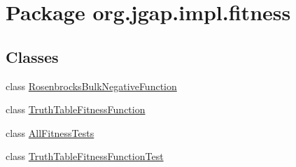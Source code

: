 \hypertarget{namespaceorg_1_1jgap_1_1impl_1_1fitness}{\section{Package org.\-jgap.\-impl.\-fitness}
\label{namespaceorg_1_1jgap_1_1impl_1_1fitness}
}
\subsection*{Classes}
\begin{DoxyCompactItemize}
\item 
class \hyperlink{classorg_1_1jgap_1_1impl_1_1fitness_1_1_rosenbrocks_bulk_negative_function}{Rosenbrocks\-Bulk\-Negative\-Function}
\item 
class \hyperlink{classorg_1_1jgap_1_1impl_1_1fitness_1_1_truth_table_fitness_function}{Truth\-Table\-Fitness\-Function}
\item 
class \hyperlink{classorg_1_1jgap_1_1impl_1_1fitness_1_1_all_fitness_tests}{All\-Fitness\-Tests}
\item 
class \hyperlink{classorg_1_1jgap_1_1impl_1_1fitness_1_1_truth_table_fitness_function_test}{Truth\-Table\-Fitness\-Function\-Test}
\end{DoxyCompactItemize}
